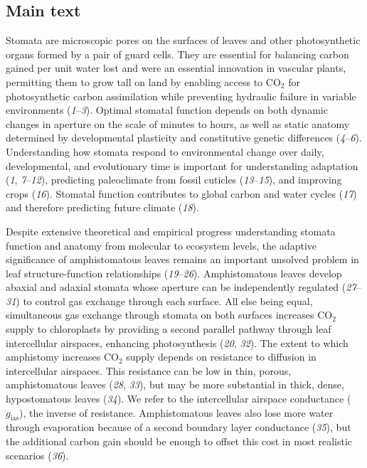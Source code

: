 \documentclass[
  letterpaper,
  DIV=11,
  numbers=noendperiod]{scrartcl}
\newcommand{\gias}{$g_\text{ias}$}
\begin{document}
\subsection{Main text}\label{main-text}

Stomata are microscopic pores on the surfaces of leaves and other
photosynthetic organs formed by a pair of guard cells. They are
essential for balancing carbon gained per unit water lost and were an
essential innovation in vascular plants, permitting them to grow tall on
land by enabling access to CO\(_2\) for photosynthetic carbon
assimilation while preventing hydraulic failure in variable environments
(\emph{1}--\emph{3}). Optimal stomatal function depends on both dynamic
changes in aperture on the scale of minutes to hours, as well as static
anatomy determined by developmental plasticity and constitutive genetic
differences (\emph{4}--\emph{6}). Understanding how stomata respond to
environmental change over daily, developmental, and evolutionary time is
important for understanding adaptation (\emph{1}, \emph{7}--\emph{12}),
predicting paleoclimate from fossil cuticles (\emph{13}--\emph{15}), and
improving crops (\emph{16}). Stomatal function contributes to global
carbon and water cycles (\emph{17}) and therefore predicting future
climate (\emph{18}).

Despite extensive theoretical and empirical progress understanding
stomata function and anatomy from molecular to ecosystem levels, the
adaptive significance of amphistomatous leaves remains an important
unsolved problem in leaf structure-function relationships
(\emph{19}--\emph{26}). Amphistomatous leaves develop abaxial and
adaxial stomata whose aperture can be independently regulated
(\emph{27}--\emph{31}) to control gas exchange through each surface. All
else being equal, simultaneous gas exchange through stomata on both
surfaces increases CO\(_2\) supply to chloroplasts by providing a second
parallel pathway through leaf intercellular airspaces, enhancing
photosynthesis (\emph{20}, \emph{32}). The extent to which amphistomy
increases CO\(_2\) supply depends on resistance to diffusion in
intercellular airspaces. This resistance can be low in thin, porous,
amphistomatous leaves (\emph{28}, \emph{33}), but may be more
substantial in thick, dense, hypostomatous leaves (\emph{34}). We refer
to the intercellular airspace conductance (\gias), the inverse of
resistance. Amphistomatous leaves also lose more water through
evaporation because of a second boundary layer conductance (\emph{35}),
but the additional carbon gain should be enough to offset this cost in
most realistic scenarios (\emph{36}).
\end{document}
